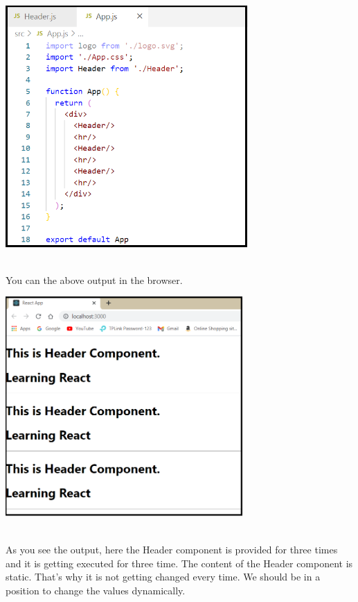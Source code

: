 \documentclass{article}
\begin{document}
\begin{center}
	\noindent \includegraphics*[width=3.65in, height=3.62in]{IMG-08-02}
\end{center}

\noindent \\
You can the above output in the browser.

\begin{center}
	\noindent \includegraphics*[width=3.56in, height=3.30in]{IMG-08-03}
\end{center}

\noindent 

\noindent \\
As you see the output, here the Header component is provided for three times and it is getting executed for three time. The content of the Header component is static. That's why it is not getting changed every time. We should be in a position to change the values dynamically.
\end{document}
